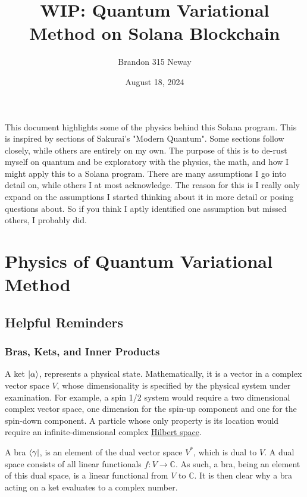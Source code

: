 \documentclass[12pt]{article}
\title{\textbf{WIP: Quantum Variational Method on Solana Blockchain}}
\author{Brandon 315 Neway}
\date{August 18, 2024}
\begin{document}
\maketitle

\hspace{1cm} This document highlights some of the physics behind this Solana program. This is inspired by sections of Sakurai's "Modern Quantum". Some sections follow closely, while others are entirely on my own. The purpose of this is to de-rust myself on quantum and be exploratory with the physics, the math, and how I might apply this to a Solana program. There are many assumptions I go into detail on, while others I at most acknowledge. The reason for this is I really only expand on the assumptions I started thinking about it in more detail or posing questions about. So if you think I aptly identified one assumption but missed others, I probably did.

\section{Physics of Quantum Variational Method}
\subsection{Helpful Reminders}
\subsubsection{Bras, Kets, and Inner Products}
\hspace{1cm} A ket $\ket{\alpha}$, represents a physical state. Mathematically, it is a vector in a complex vector space $V$, whose dimensionality is specified by the physical system under examination. For example, a spin 1/2 system would require a two dimensional complex vector space, one dimension for the spin-up component and one for the spin-down component. A particle whose only property is its location would require an infinite-dimensional complex \href{https://en.wikipedia.org/wiki/Hilbert_space#Definition}{Hilbert space}. 

\hspace{1cm} A bra $\bra{\gamma}$, is an element of the dual vector space $V^*$, which is dual to $V$. A dual space consists of all linear functionals $f : V \rightarrow \mathbb{C}$. As such, a bra, being an element of this dual space, is a linear functional from $V$ to $\mathbb{C}$. It is then clear why a bra acting on a ket evaluates to a complex number.
\end{document}

